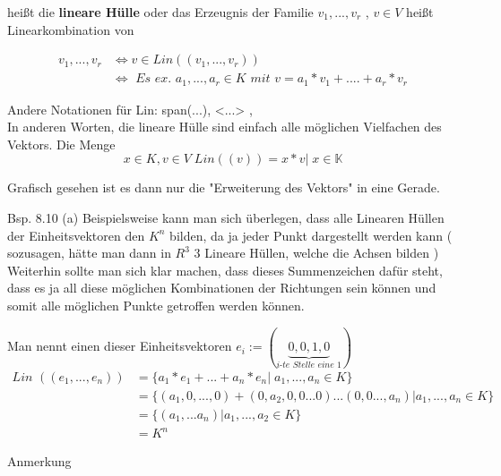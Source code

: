 \documentclass[headsepline,12pt,a4paper]{scrartcl}
\begin{document}
heißt die \textbf{lineare Hülle} oder das Erzeugnis der Familie $v_1,...,v_r$ , $v \in V$ heißt Linearkombination von 



\begin{equation}
\begin{aligned}
v_1,...,v_r &\Leftrightarrow v \in \textit{Lin}((v_1,...,v_r)) \\
	& \Leftrightarrow \textit{  Es ex. } a_1,...,a_r \in K  \textit{ mit } v= a_1*v_1+....+a_r*v_r 
\end{aligned}
\end{equation}

Andere Notationen für Lin: span(...), <...> ,  \\

In anderen Worten, die lineare Hülle sind einfach alle möglichen Vielfachen des Vektors. Die Menge 
$$ x \in K , v \in V \; Lin((v))={x*v|\; x \in \mathbb{K}} $$

Grafisch gesehen ist es dann nur die "Erweiterung des Vektors" in eine Gerade. \\
\item[Bsp. 8.10]
(a) Beispielsweise kann man sich überlegen, dass alle Linearen Hüllen der Einheitsvektoren den $K^n$ bilden, da ja jeder Punkt dargestellt werden kann ( sozusagen, hätte man dann in $R^3$ 3 Lineare Hüllen, welche die Achsen bilden ) \\
Weiterhin sollte man sich klar machen, dass dieses Summenzeichen dafür steht, dass es ja all diese möglichen Kombinationen der Richtungen sein können und somit alle möglichen Punkte getroffen werden können.

Man nennt einen dieser Einheitsvektoren $e_i:=(\underbrace{0,0,1,0}_{\textit{i-te Stelle eine 1}})$ \\


\begin{equation}
\begin{aligned}
\textit{Lin }((e_1,...,e_n)) &= \{a_1*e_1+...+a_n*e_n | \; a_1,...,a_n \in K \} \\
		&=\{(a_1,0,...,0)+(0,a_2,0,0...0)... (0,0...,a_n) | a_1,...,a_n \in K \} \\
		&= \{ (a_1,...a_n) | a_1,...,a_2 \in K\} \\
		&= K^n 
\end{aligned}
\end{equation}



\newpage

\item[Anmerkung]
\end{document}
